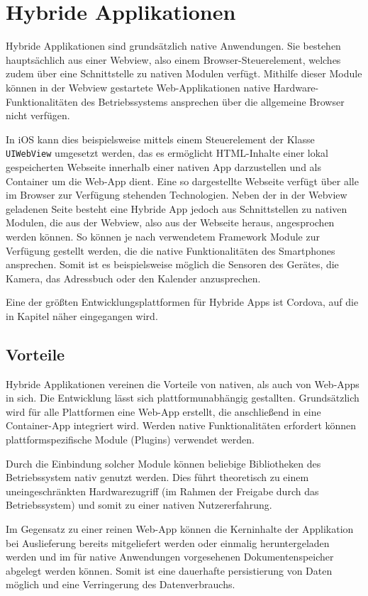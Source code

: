 \section{Hybride Applikationen}
\label{sec:HybrideApplikationen}
%
Hybride Applikationen sind grundsätzlich native Anwendungen. Sie bestehen hauptsächlich aus einer Webview, also einem Browser-Steuerelement, welches zudem über eine Schnittstelle zu nativen Modulen verfügt. Mithilfe dieser Module können in der Webview gestartete Web-Applikationen native Hardware-Funktionalitäten des Betriebssystems ansprechen über die allgemeine Browser nicht verfügen.

In iOS kann dies beispielsweise mittels einem Steuerelement der Klasse \texttt{UIWebView} \cite{uiWebView} umgesetzt werden, das es ermöglicht HTML-Inhalte einer lokal gespeicherten Webseite innerhalb einer nativen App darzustellen und als Container um die Web-App dient. Eine so dargestellte Webseite verfügt über alle im Browser zur Verfügung stehenden Technologien. Neben der in der Webview geladenen Seite besteht eine Hybride App jedoch aus Schnittstellen zu nativen Modulen, die aus der Webview, also aus der Webseite heraus, angesprochen werden können. So können je nach verwendetem Framework Module zur Verfügung gestellt werden, die die native Funktionalitäten des Smartphones ansprechen. Somit ist es beispielsweise möglich die Sensoren des Gerätes, die Kamera, das Adressbuch oder den Kalender anzusprechen. 

Eine der größten Entwicklungsplattformen für Hybride Apps ist Cordova, auf die in Kapitel  näher eingegangen wird.  
%
\subsection{Vorteile}
Hybride Applikationen vereinen die Vorteile von nativen, als auch von Web-Apps in sich. Die Entwicklung lässt sich plattformunabhängig gestallten. Grundsätzlich wird für alle Plattformen eine Web-App erstellt, die anschließend in eine Container-App integriert wird. Werden native Funktionalitäten erfordert können plattformspezifische Module (Plugins) verwendet werden.

Durch die Einbindung solcher Module können beliebige Bibliotheken des Betriebssystem nativ genutzt werden. Dies führt theoretisch zu einem uneingeschränkten Hardwarezugriff (im Rahmen der Freigabe durch das Betriebssystem) und somit zu einer nativen Nutzererfahrung. 

Im Gegensatz zu einer reinen Web-App können die Kerninhalte der Applikation bei Auslieferung bereits mitgeliefert werden oder einmalig heruntergeladen werden und im für native Anwendungen vorgesehenen Dokumentenspeicher abgelegt werden können. Somit ist eine dauerhafte persistierung von Daten möglich und eine Verringerung des Datenverbrauchs.

